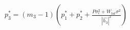 \documentclass[preview]{standalone}
\begin{document}
\begin{align*}
p_3^\ast = \left(m_3 - 1\right) \left( p_1^\ast + p_2^\ast + \frac{P \sigma_\epsilon^2 + W_{tot} \sigma^2}{\left|\hat{h_3}\right|^2}\right)
\end{align*}
\end{document}

